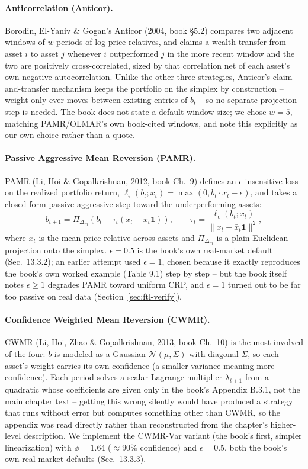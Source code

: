 \documentclass[11pt]{article}
\begin{document}
\paragraph{Anticorrelation (Anticor).}
Borodin, El-Yaniv \& Gogan's Anticor (2004, book \S5.2) compares two
adjacent windows of $w$ periods of log price relatives, and claims a
wealth transfer from asset $i$ to asset $j$ whenever $i$ outperformed
$j$ in the more recent window and the two are positively
cross-correlated, sized by that correlation net of each asset's own
negative autocorrelation. Unlike the other three strategies, Anticor's
claim-and-transfer mechanism keeps the portfolio on the simplex by
construction -- weight only ever moves between existing entries of
$b_t$ -- so no separate projection step is needed. The book does not
state a default window size; we chose $w=5$, matching PAMR/OLMAR's own
book-cited windows, and note this explicitly as our own choice rather
than a quote.

\paragraph{Passive Aggressive Mean Reversion (PAMR).}
PAMR (Li, Hoi \& Gopalkrishnan, 2012, book Ch.~9) defines an
$\epsilon$-insensitive loss on the realized portfolio return,
$\ell_\epsilon(b_t; x_t) = \max(0, b_t \cdot x_t - \epsilon)$, and takes
a closed-form passive-aggressive step toward the underperforming
assets:
\[
    b_{t+1} = \Pi_{\Delta_m}\!\left(b_t - \tau_t (x_t - \bar{x}_t \mathbf{1})\right),
    \qquad
    \tau_t = \frac{\ell_\epsilon(b_t; x_t)}{\lVert x_t - \bar{x}_t \mathbf{1} \rVert^2},
\]
where $\bar{x}_t$ is the mean price relative across assets and
$\Pi_{\Delta_m}$ is a plain Euclidean projection onto the simplex.
$\epsilon = 0.5$ is the book's own real-market default (Sec.~13.3.2);
an earlier attempt used $\epsilon = 1$, chosen because it exactly
reproduces the book's own worked example (Table 9.1) step by step --
but the book itself notes $\epsilon \geq 1$ degrades PAMR toward
uniform CRP, and $\epsilon = 1$ turned out to be far too passive on
real data (Section~\ref{sec:ftl-verify}).

\paragraph{Confidence Weighted Mean Reversion (CWMR).}
CWMR (Li, Hoi, Zhao \& Gopalkrishnan, 2013, book Ch.~10) is the most
involved of the four: $b$ is modeled as a Gaussian $\mathcal{N}(\mu,
\Sigma)$ with diagonal $\Sigma$, so each asset's weight carries its own
confidence (a smaller variance meaning more confidence). Each period
solves a scalar Lagrange multiplier $\lambda_{t+1}$ from a quadratic
whose coefficients are given only in the book's Appendix B.3.1, not the
main chapter text -- getting this wrong silently would have produced a
strategy that runs without error but computes something other than
CWMR, so the appendix was read directly rather than reconstructed from
the chapter's higher-level description. We implement the CWMR-Var
variant (the book's first, simpler linearization) with $\phi = 1.64$
($\approx 90\%$ confidence) and $\epsilon = 0.5$, both the book's own
real-market defaults (Sec.~13.3.3).
\end{document}
